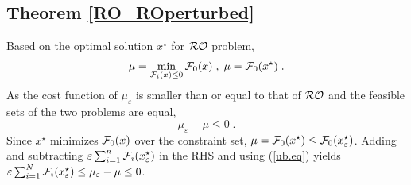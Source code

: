 \documentclass[journal,twoside,web]{ieeecolor}
\begin{document}

\subsection{Theorem \ref{RO_ROperturbed}}

Based on the optimal solution $x^\star$ for ${\cal RO}$ problem, 
\begin{align*}
\mu=\min_{{\cal F}_i(x)\leq  0} {\cal F}_0(x)\;,\; \mu={\cal F}_0(x^\star)\;.
\end{align*}
As the cost function of $\mu_\varepsilon$ is smaller than or equal to that of ${\cal RO}$ and the feasible sets of the two problems are equal, 
\begin{equation}\label{ub.eq}
 \mu_\varepsilon-\mu\leq 0\;.
\end{equation}
Since $x^\star$ minimizes ${\cal F}_0(x)$ over the constraint set, $\mu={\cal F}_0(x^\star)\leq {\cal F}_0(x_\varepsilon^\star)$.
Adding and subtracting $\varepsilon\sum_{i=1}^n{\cal F}_i(x^\star_\varepsilon)$
in the RHS and using (\ref{ub.eq}) yields $\varepsilon \sum_{i=1}^N{\cal F}_{i}(x_\varepsilon^\star)\leq 
\mu_\varepsilon-\mu\leq 0$\;.
\end{document}
